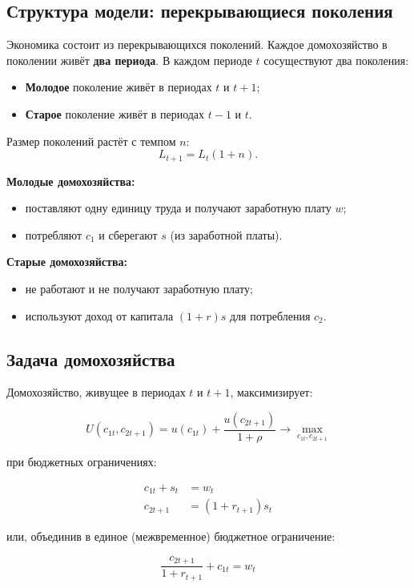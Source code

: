 \documentclass[10pt,a4paper]{article}
\begin{document}
\subsection{Структура модели: перекрывающиеся поколения}

Экономика состоит из перекрывающихся поколений. Каждое домохозяйство в поколении живёт \textbf{два периода}. В каждом периоде $t$ сосуществуют два поколения:
\begin{itemize}[leftmargin=1.3em]
\item \textbf{Молодое} поколение живёт в периодах $t$ и $t+1$;
\item \textbf{Старое} поколение живёт в периодах $t-1$ и $t$.
\end{itemize}

Размер поколений растёт с темпом $n$:
$$L_{t+1} = L_t(1+n).$$

\textbf{Молодые домохозяйства:}
\begin{itemize}[leftmargin=1.3em]
\item поставляют одну единицу труда и получают заработную плату $w$;
\item потребляют $c_1$ и сберегают $s$ (из заработной платы).
\end{itemize}

\textbf{Старые домохозяйства:}
\begin{itemize}[leftmargin=1.3em]
\item не работают и не получают заработную плату;
\item используют доход от капитала $(1+r)s$ для потребления $c_2$.
\end{itemize}

\subsection{Задача домохозяйства}

Домохозяйство, живущее в периодах $t$ и $t+1$, максимизирует:
\begin{formulabox}
\begin{equation}
U(c_{1t}, c_{2t+1}) = u(c_{1t}) + \frac{u(c_{2t+1})}{1+\rho} \to \max_{c_{1t}, c_{2t+1}} \tag{4.1}
\end{equation}
\end{formulabox}
при бюджетных ограничениях:
\begin{formulabox}
\begin{align}
c_{1t} + s_t &= w_t \tag{4.2}\\
c_{2t+1} &= (1+r_{t+1})s_t \tag{4.3}
\end{align}
\end{formulabox}
или, объединив в единое (межвременное) бюджетное ограничение:
\begin{formulabox}
\begin{equation}
\frac{c_{2t+1}}{1+r_{t+1}} + c_{1t} = w_t \tag{4.4}
\end{equation}
\end{formulabox}
\end{document}
